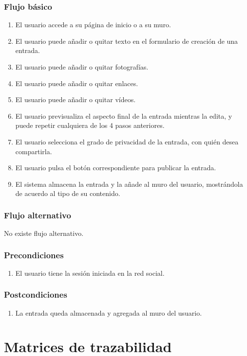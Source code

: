 \documentclass[12pt, a4paper, titlepage]{article}
\begin{document}
\subsubsection{Flujo básico}
\begin{enumerate}
	\item El usuario accede a su página de inicio o a su muro.
	\item El usuario puede añadir o quitar texto en el formulario de creación de una entrada.
	\item El usuario puede añadir o quitar fotografías.
	\item El usuario puede añadir o quitar enlaces.
	\item El usuario puede añadir o quitar vídeos.
	\item El usuario previsualiza el aspecto final de la entrada mientras la edita, y puede repetir cualquiera de los 4 pasos anteriores.
	\item El usuario selecciona el grado de privacidad de la entrada, con quién desea compartirla.
	\item El usuario pulsa el botón correspondiente para publicar la entrada.
	\item El sistema almacena la entrada y la añade al muro del usuario, mostrándola de acuerdo al tipo de su contenido.
\end{enumerate}
\subsubsection{Flujo alternativo}
No existe flujo alternativo.
\subsubsection{Precondiciones}
\begin{enumerate}
	\item El usuario tiene la sesión iniciada en la red social.
\end{enumerate}
\subsubsection{Postcondiciones}
\begin{enumerate}
	\item La entrada queda almacenada y agregada al muro del usuario.
\end{enumerate}



\section{Matrices de trazabilidad}  
\end{document}
